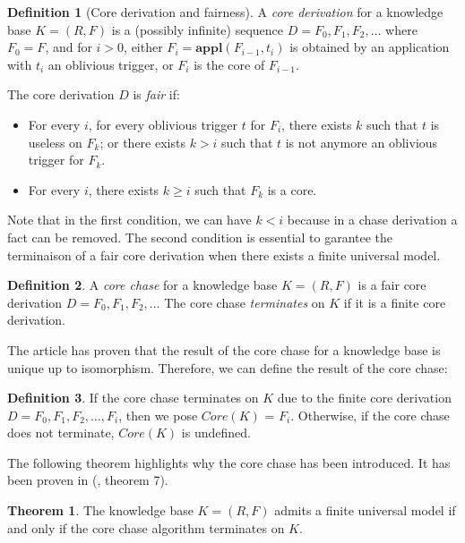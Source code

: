 \documentclass{article}
\theoremstyle{definition}
\newtheorem{definition}{Definition}[section]
\newtheorem{theorem}{Theorem}[section]
\theoremstyle{remark}
\newcommand{\Appl}{\textbf{appl}}
\begin{document}
\begin{definition}[Core derivation and fairness]
A \emph{core derivation} for a knowledge base $K = (R,F)$ is a (possibly infinite) sequence $D = F_0, F_1, F_2, \ldots$ where $F_0 = F$, and for $i >0$, either $F_{i}= \Appl(F_{i-1},t_i)$ is obtained by an application with $t_i$ an oblivious trigger, or $F_i$ is the core of $F_{i-1}$. 

The core derivation $D$ is \emph{fair} if:
\begin{itemize}
\item For every $i$, for every oblivious trigger $t$ for $F_i$, there exists $k$ such that $t$ is useless on $F_k$; or there exists $k > i$ such that $t$ is not anymore an oblivious trigger for $F_k$.
\item For every $i$, there exists $k \geq i$ such that $F_k$ is a core.

\end{itemize}
\end{definition}

Note that in the first condition, we can have $k <i$ because in a chase derivation a fact can be removed. The second condition is essential to garantee the terminaison of a fair core derivation when there exists a finite universal model.

\begin{definition}
A \emph{core chase} for a knowledge base $K= (R,F)$ is a fair core derivation $D=F_0,F_1,F_2,\ldots$ The core chase \emph{terminates} on $K$ if it is a finite core derivation.
\end{definition}

The article \cite{core_chase} has proven that the result of the core chase for a knowledge base is unique up to isomorphism. Therefore, we can define the result of the core chase:

\begin{definition}
If the core chase terminates on $K$ due to the finite core derivation $D=F_0,F_1,F_2,\ldots,F_i$, then we pose \emph{$\textit{Core}(K)$} = $F_i$. Otherwise, if the core chase does not terminate, $\textit{Core}(K)$ is undefined.
\end{definition}

The following theorem highlights why the core chase has been introduced. It has been proven in (\cite{core_chase}, theorem 7).

\begin{theorem}
The knowledge base $K = (R,F)$ admits a finite universal model if and only if the core chase algorithm terminates on $K$.
\end{theorem}
\end{document}
